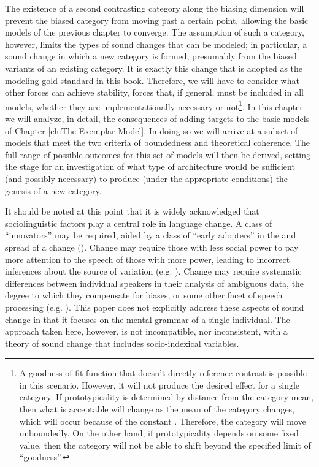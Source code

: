 The existence of a second contrasting category along the biasing dimension
will prevent the biased category from moving past a certain point,
allowing the basic  models of the previous chapter to converge.
The assumption of such a category, however, limits the types of sound
changes that can be modeled; in particular, a sound change in which
a new category is formed, presumably from the biased variants of an
existing category. It is exactly this change that is adopted as the
modeling gold standard in this book. Therefore, we will have to consider
what other forces can achieve stability, forces that, if general,
must be included in all models, whether they are implementationally
necessary or not\footnote{A goodness-of-fit function that doesn't directly reference contrast
is possible in this scenario. However, it will not produce the desired
effect for a single category. If prototypicality is determined by
distance from the category mean, then what is acceptable will change
as the mean of the category changes, which will occur because of the
constant  . Therefore, the category will move unboundedly.
On the other hand, if prototypicality depends on some fixed value,
then the category will not be able to shift beyond the specified limit
of ``goodness''. }. In this chapter we will analyze, in detail, the consequences of
adding  targets to the basic  models of Chapter
\ref{ch:The-Exemplar-Model}. In doing so we will arrive at a subset
of models that meet the two criteria of boundedness and theoretical
coherence. The full range of possible outcomes for this set of models
will then be derived, setting the stage for an investigation of what
type of architecture would be sufficient (and possibly necessary)
to produce (under the appropriate conditions) the genesis of a new
 category.

It should be noted at this point that it is widely acknowledged that
sociolinguistic factors play a central role in language change. A
class of ``innovators'' may be required, aided by a class of ``early
adopters'' in the  and spread of a change (\citealt{milroy1985linguistic}).
Change may require those with less social power to pay more attention
to the speech of those with more power, leading to incorrect inferences
about the source of  variation (e.g. \citealt{Garrett2013}).
Change may require systematic differences between individual speakers
in their analysis of ambiguous data, the degree to which they compensate
for  biases, or some other facet of speech processing (e.g.
\citealp{Beddor2009,yu2013socio}). This paper does not explicitly
address these aspects of sound change in that it focuses on the mental
grammar of a single individual. The approach taken here, however,
is not incompatible, nor inconsistent, with a theory of sound change
that includes socio-indexical variables.

